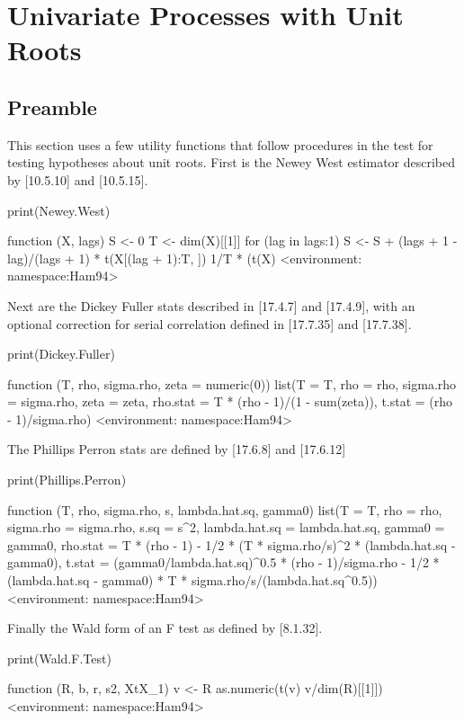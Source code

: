 \documentclass[a4paper]{article}
\begin{document}
\section{Univariate Processes with Unit Roots}
\subsection{Preamble}
This section uses a few utility functions that follow procedures in the test for testing hypotheses about unit roots.
First is the Newey West estimator described by [10.5.10] and [10.5.15].
\begin{Schunk}
\begin{Sinput}
 print(Newey.West)
\end{Sinput}
\begin{Soutput}
function (X, lags) 
{
    S <- 0
    T <- dim(X)[[1]]
    for (lag in lags:1) S <- S + (lags + 1 - lag)/(lags + 1) * 
        t(X[(lag + 1):T, ]) %
    1/T * (t(X) %
}
<environment: namespace:Ham94>
\end{Soutput}
\end{Schunk}
Next are the Dickey Fuller stats described in [17.4.7] and [17.4.9], with an optional correction for
serial correlation defined in [17.7.35] and [17.7.38].
\begin{Schunk}
\begin{Sinput}
 print(Dickey.Fuller)
\end{Sinput}
\begin{Soutput}
function (T, rho, sigma.rho, zeta = numeric(0)) 
{
    list(T = T, rho = rho, sigma.rho = sigma.rho, zeta = zeta, 
        rho.stat = T * (rho - 1)/(1 - sum(zeta)), t.stat = (rho - 
            1)/sigma.rho)
}
<environment: namespace:Ham94>
\end{Soutput}
\end{Schunk}
The Phillips Perron stats are defined by [17.6.8] and [17.6.12]
\begin{Schunk}
\begin{Sinput}
 print(Phillips.Perron)
\end{Sinput}
\begin{Soutput}
function (T, rho, sigma.rho, s, lambda.hat.sq, gamma0) 
{
    list(T = T, rho = rho, sigma.rho = sigma.rho, s.sq = s^2, 
        lambda.hat.sq = lambda.hat.sq, gamma0 = gamma0, rho.stat = T * 
            (rho - 1) - 1/2 * (T * sigma.rho/s)^2 * (lambda.hat.sq - 
            gamma0), t.stat = (gamma0/lambda.hat.sq)^0.5 * (rho - 
            1)/sigma.rho - 1/2 * (lambda.hat.sq - gamma0) * T * 
            sigma.rho/s/(lambda.hat.sq^0.5))
}
<environment: namespace:Ham94>
\end{Soutput}
\end{Schunk}
Finally the Wald form of an F test as defined by [8.1.32].
\begin{Schunk}
\begin{Sinput}
 print(Wald.F.Test)
\end{Sinput}
\begin{Soutput}
function (R, b, r, s2, XtX_1) 
{
    v <- R %
    as.numeric(t(v) %
        v/dim(R)[[1]])
}
<environment: namespace:Ham94>
\end{Soutput}
\end{Schunk}
\end{document}
